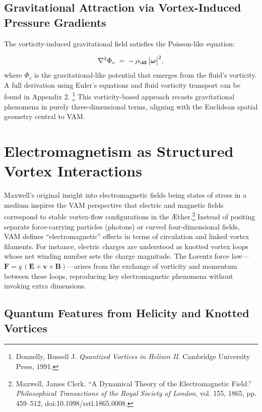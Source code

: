 \subsection*{Gravitational Attraction via Vortex-Induced Pressure Gradients}
The vorticity-induced gravitational field satisfies the Poisson-like equation:

\[
    \nabla^2 \Phi_{v} \;=\; -\,\rho_{\mathrm{\AE}} \,\bigl|\boldsymbol{\omega}\bigr|^{2},
\]
where \(\Phi_{v}\) is the gravitational-like potential that emerges from the fluid’s vorticity. A full derivation using Euler’s equations and fluid vorticity transport can be found in Appendix 2.
\footnote{Donnelly, Russell J. \textit{Quantized Vortices in Helium II}. Cambridge University Press, 1991.} This vorticity-based approach recasts gravitational phenomena in purely three-dimensional terms, aligning with the Euclidean spatial geometry central to VAM.

\section{Electromagnetism as Structured Vortex Interactions}

Maxwell’s original insight into electromagnetic fields being states of stress in a medium inspires the VAM perspective that electric and magnetic fields correspond to stable vortex-flow configurations in the Æther.\footnote{Maxwell, James Clerk. “A Dynamical Theory of the Electromagnetic Field.” \textit{Philosophical Transactions of the Royal Society of London}, vol. 155, 1865, pp. 459–512, doi:10.1098/rstl.1865.0008.} Instead of positing separate force-carrying particles (photons) or curved four-dimensional fields, VAM defines “electromagnetic” effects in terms of circulation and linked vortex filaments. For instance, electric charges are understood as knotted vortex loops whose net winding number sets the charge magnitude. The Lorentz force law—\(\mathbf{F} = q\,(\mathbf{E} + \mathbf{v}\times\mathbf{B})\)—arises from the exchange of vorticity and momentum between these loops, reproducing key electromagnetic phenomena without invoking extra dimensions.

\subsection*{Quantum Features from Helicity and Knotted Vortices}

